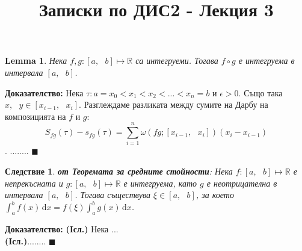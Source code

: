 \documentclass[12pt]{article}
\newtheorem{corollary}{Следствие}
\newtheorem{lemma}{Lemma}
\newcommand{\spc}{\text{ }}
\begin{document}
	\color{white}
	\pagecolor{darkgray}
	\title{Записки по ДИС2 - Лекция 3}
	\maketitle
	\textbf{ }
	
	\begin{lemma}
		Нека $f,g: \left[a,\spc b\right] \mapsto \mathbb{R}$ са интегруеми. Тогава $f\circ g$ е интегруема в интервала $\left[a,\spc b\right]$.
	\end{lemma}
	\textbf{Доказателство:} Нека $\tau : a=x_{0}<x_{1}<x_{2}<...<x_{n}=b$ и $\epsilon>0$. Също така $x,\spc y\in\left[x_{i-1},\spc x_{i}\right]$. Разглеждаме разликата между сумите на Дарбу на композицията на $f$ и $g$:
	\[S_{fg}(\tau)-s_{fg}(\tau)=\sum_{i=1}^{n}\omega (fg;\left[x_{i-1},\spc x_{i}\right])(x_{i} - x_{i-1})\].
	........
	$\blacksquare$
	
	\begin{corollary}
		\textbf{от Теоремата за средните стойности}: Нека $f: \left[a,\spc b\right] \mapsto \mathbb{R}$ е непрекъсната и $g: \left[a,\spc b\right] \mapsto \mathbb{R}$ е интегруема, като $g$ е неотрицателна в интервала $\left[a,\spc b\right]$. Тогава съществува $\xi\in\left[a,\spc b\right]$, за което $\int_{a}^{b} f(x)\,\mathrm{d}x = f(\xi)\int_{a}^{b} g(x)\,\mathrm{d}x$.
	\end{corollary}
	\textbf{Доказателство:} \textbf{(Iсл.)} Нека ...\\
	\textbf{(Iсл.)}........
	$\blacksquare$
	
	
\end{document}

